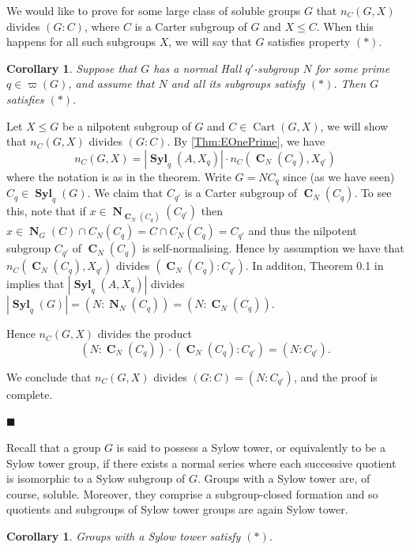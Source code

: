 \documentclass[a4paper,12pt,reqno]{amsart}
\newtheorem{corollary}[theorem]{Corollary}
\numberwithin{equation}{section}
\DeclareMathOperator{\N}{\mathbf{N}}
\DeclareMathOperator{\cart}{Cart}
\DeclareMathOperator{\cent}{\mathbf{C}}
\DeclareMathOperator{\syl}{\mathbf{Syl}}
\renewcommand{\leq}{\leqslant}
\newenvironment{proofof}{{\bf {Proof.} }}{\hfill $\blacksquare$ \\}
\begin{document}
 We would like to prove for some large class of soluble groups $G$ 
that $n_C(G,X)$ divides $(G:C)$, where $C$ is a Carter subgroup of $G$ and $X \leq C$. 
When this happens for all such subgroups $X$, 
we will say that $G$ satisfies property $(*)$.


\begin{corollary}\label{Cor:Asterisk}
Suppose that $G$ has a normal Hall $q'$-subgroup $N$ for some prime $q \in  \varpi(G)$, 
and assume that  $N$ and all its  subgroups satisfy $(*)$. 
Then $G$ satisfies $(*)$.
\end{corollary}

\begin{proofof}
Let  $X \leq G$ be a nilpotent subgroup of $G$ and $C \in \cart(G, X)$, we will show that $n_C(G,X)$ divides $(G:C)$.
By \autoref{Thm:EOnePrime}, we have 
\[
n_C(G,X) =|\syl_q(A, X_q) | \cdot n_C(\cent_N(C_{q}), X_{q'})
\]
where the notation is as in the theorem. Write $G=NC_q$   since (as we have seen)  $C_q \in \syl_q(G)$.
We claim that $C_{q'}$  is a Carter subgroup of $\cent_N(C_{q})$. 
To see this, note that if $x \in \N_{\cent_N(C_{q})} (C_{q'})$ then $x \in \N_G(C)  \cap C_N(C_q) = C  \cap C_N(C_q) = C_{q'}$ and thus the nilpotent subgroup  $C_{q'}$
of $\cent_N(C_{q})$ is self-normalising. Hence by assumption we have that 
$n_C(\cent_N(C_{q}), X_{q'})$
divides $(\cent_N(C_{q}) : C_{q'})$. In additon, Theorem 0.1 in \cite{arithmetical_questions} implies that $|\syl_q(A, X_q) |$ divides $|\syl_q(G) |= (N: \N_N(C_{q}))= (N: \cent_N(C_{q}))$.  

Hence $n_C(G,X)$ divides the product 
\[
(N: \cent_N(C_{q})) \cdot (\cent_N(C_{q}) : C_{q'}) = (N:C_{q'}).
\]

We conclude that $n_C(G,X)$ divides $(G:C)= (N:C_{q'})$, and  the proof is complete.

\end{proofof}

Recall that a group $G$ is said to possess a Sylow tower, 
or equivalently to be a Sylow tower group,
if there exists a normal series where each successive quotient is isomorphic to a Sylow subgroup of $G$.
Groups with a Sylow tower are, of course, soluble.
Moreover, they comprise a subgroup-closed formation 
and so quotients and subgroups of Sylow tower groups are again Sylow tower.

\begin{corollary}\label{Cor:SylowTower}
Groups with a Sylow tower satisfy $(*)$.
\end{corollary}
\end{document}

